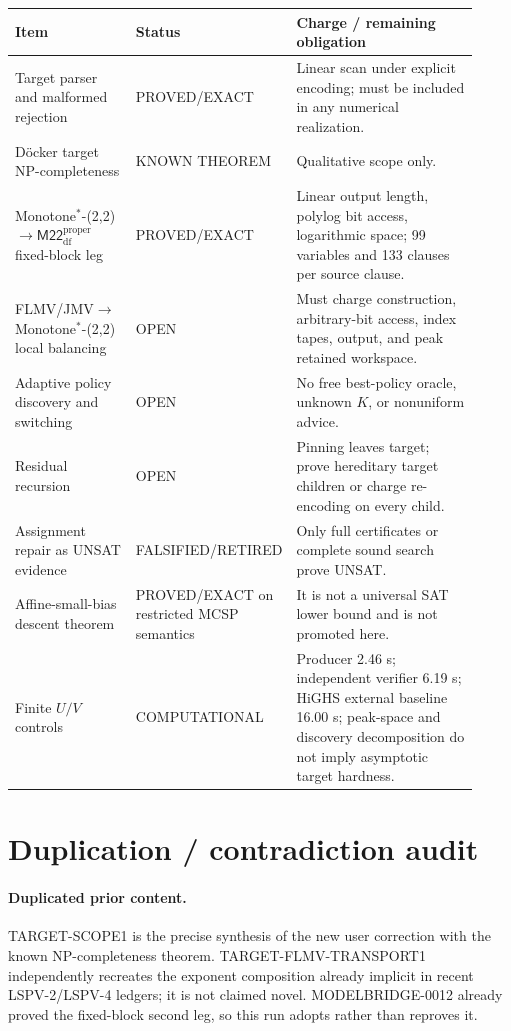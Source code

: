 \documentclass[11pt]{article}
\newcommand{\M}{\mathsf{M22}^{\mathrm{proper}}_{\mathrm{df}}}
\begin{document}
\begin{longtable}{p{0.28\linewidth}p{0.19\linewidth}p{0.45\linewidth}}
\toprule
Item & Status & Charge / remaining obligation \\
\midrule
Target parser and malformed rejection & PROVED/EXACT & Linear scan under explicit
encoding; must be included in any numerical realization. \\
D\"ocker target NP-completeness & KNOWN THEOREM & Qualitative scope only. \\
Monotone$^*$-(2,2)$\to\M$ fixed-block leg & PROVED/EXACT & Linear output length,
polylog bit access, logarithmic space; 99 variables and 133 clauses per source clause. \\
FLMV/JMV$\to$Monotone$^*$-(2,2) local balancing & OPEN & Must charge construction,
arbitrary-bit access, index tapes, output, and peak retained workspace. \\
Adaptive policy discovery and switching & OPEN & No free best-policy oracle, unknown
$K$, or nonuniform advice. \\
Residual recursion & OPEN & Pinning leaves target; prove hereditary target children or
charge re-encoding on every child. \\
Assignment repair as UNSAT evidence & FALSIFIED/RETIRED & Only full certificates or
complete sound search prove UNSAT. \\
Affine-small-bias descent theorem & PROVED/EXACT on restricted MCSP semantics & It is
not a universal SAT lower bound and is not promoted here. \\
Finite $U/V$ controls & COMPUTATIONAL & Producer 2.46 s; independent verifier 6.19 s;
HiGHS external baseline 16.00 s; peak-space and discovery decomposition do not imply
asymptotic target hardness. \\
\bottomrule
\end{longtable}

\section{Duplication / contradiction audit}

\paragraph{Duplicated prior content.}
TARGET-SCOPE1 is the precise synthesis of the new user correction with the known
NP-completeness theorem.  TARGET-FLMV-TRANSPORT1 independently recreates the exponent
composition already implicit in recent LSPV-2/LSPV-4 ledgers; it is not claimed novel.
MODELBRIDGE-0012 already proved the fixed-block second leg, so this run adopts rather
than reproves it.
\end{document}
